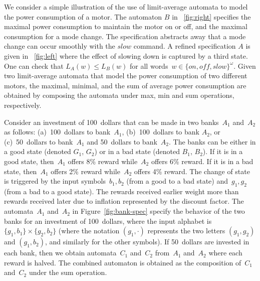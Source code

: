 \documentclass{llncs}
\def\set#1{\ensuremath{\{#1\}}}
\begin{document}
\smallskip{} We consider a simple illustration of the use of limit-average automata
to model the power consumption of a motor. The automaton $B$ in \figurename~\ref{fig:right}
specifies the maximal power consumption to maintain the motor on or off, and the 
maximal consumption for a mode change. The specification abstracts away that a mode
change can occur smoothly with the $\mathit{slow}$ command. A refined specification $A$ is 
given in \figurename~\ref{fig:left} where the effect of slowing down is captured
by a third state. One can check that $L_{A}(w)\leq L_{B}(w)$ 
for all words~$w \in \{\mathit{on},\mathit{off},\mathit{slow}\}^\omega$.
Given two limit-average automata that model the power consumption of 
two different motors, the maximal, minimal, and the sum of average power 
consumption are obtained by composing the automata under max, min and sum 
operations, respectively. 

\smallskip{} Consider an investment of 100~dollars
that can be made in two banks~$A_1$ and~$A_2$ as follows: 
(a)~100~dollars to bank~$A_1$, (b)~100~dollars to bank $A_2$, or
(c)~50~dollars to bank~$A_1$ and 50~dollars to bank~$A_2$.
The banks can be either in a good state (denoted $G_1$, $G_2$)
or in a bad state (denoted $B_1$, $B_2$).
If it is in a good state, then~$A_1$ offers 8\% reward while~$A_2$ offers 6\% reward.
If it is in a bad state, then~$A_1$ offers 2\% reward while~$A_2$ offers 4\% reward.
The change of state is triggered by the input symbols~$b_1, b_2$ (from a good
to a bad state) and~$g_1, g_2$ (from a bad to a good state).
The rewards received earlier weight more than rewards received later 
due to inflation represented by the discount factor.
The automata~$A_1$ and~$A_2$ in Figure~\ref{fig:bank-spec} specify the behavior 
of the two banks for an investment of 100~dollars, where the input alphabet is 
$\set{g_1,b_1} \times \set{g_2,b_2}$ (where the notation $(g_1,\cdot)$ 
represents the two letters $(g_1,g_2)$ and $(g_1,b_2)$, and similarly for the other symbols). 
If 50~dollars are invested in each bank, then we obtain automata~$C_1$ and~$C_2$ 
from~$A_1$ and~$A_2$ where each reward is halved. 
The combined automaton is obtained as the composition of~$C_1$ and~$C_2$ 
under the sum operation.
\end{document}
